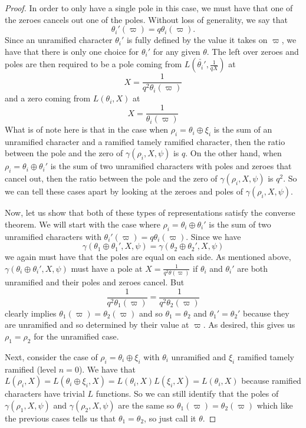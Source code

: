 \begin{proof}
  In order to only have a single pole in this case, we must have that one of the zeroes cancels out one of the poles.
  Without loss of generality, we say that 
  \[\theta_i'(\varpi) = q\theta_i(\varpi).\]
  Since an unramified character $\theta_i'$ is fully defined by the value it takes on $\varpi$, we have that there is only one choice for $\theta_i'$ for any given $\theta$.
  The left over zeroes and poles are then required to be a pole coming from $L(\check{\theta_i'},\frac{1}{qX})$ at 
  \[X = \frac{1}{q^2 \theta_i(\varpi)}\]
  and a zero coming from $L(\theta_i,X)$ at
  \[X = \frac{1}{\theta_i(\varpi)}\]
  What is of note here is that in the case when $\rho_i = \theta_i \oplus \xi_i$ is the sum of an unramified character and a ramified tamely ramified character, then the ratio between the pole and the zero of $\gamma(\rho_i,X,\psi)$ is $q$.
  On the other hand, when $\rho_i = \theta_i \oplus \theta_i'$ is the sum of two unramified characters with poles and zeroes that cancel out, then the ratio between the pole and the zero of $\gamma(\rho_i,X,\psi)$ is $q^2$.
  So we can tell these cases apart by looking at the zeroes and poles of $\gamma(\rho_i,X,\psi)$.


  Now, let us show that both of these types of representations satisfy the converse theorem.
  We will start with the case where $\rho_i = \theta_i \oplus \theta_i'$ is the sum of two unramified characters with $\theta_i'(\varpi) = q \theta_i (\varpi)$.
  Since we have
  \[\gamma(\theta_1 \oplus \theta_1', X, \psi) = \gamma(\theta_2 \oplus \theta_2',X,\psi)\]
  we again must have that the poles are equal on each side.
  As mentioned above, $\gamma(\theta_i \oplus \theta_i' ,X, \psi)$ must have a pole at $X = \frac{1}{q^2 \theta(\varpi)}$ if $\theta_i$ and $\theta_i'$ are both unramified and their poles and zeroes cancel.
  But \[\frac{1}{q^2 \theta_1(\varpi)} = \frac{1}{q^2 \theta_2(\varpi)}\]
  clearly implies $\theta_1(\varpi) = \theta_2(\varpi)$ and so $\theta_1 = \theta_2$ and $\theta_1' = \theta_2'$ because they are unramified and so determined by their value at $\varpi$.
  As desired, this gives us $\rho_1 = \rho_2$ for the unramified case.

  Next, consider the case of $\rho_i = \theta_i \oplus \xi_i$ with $\theta_i$ unramified and $\xi_i$ ramified tamely ramified (level $n = 0$).
  We have that $L(\rho_i,X) = L(\theta_i \oplus \xi_i ,X) = L(\theta_i,X)L(\xi_i,X) = L(\theta_i,X)$ because ramified characters have trivial $L$ functions.
  So we can still identify that the poles of $\gamma(\rho_1,X,\psi)$ and $\gamma(\rho_2,X,\psi)$ are the same so $\theta_1(\varpi) = \theta_2(\varpi)$ which like the previous cases tells us that $\theta_1 = \theta_2$, so just call it $\theta$.
  

\end{proof}
